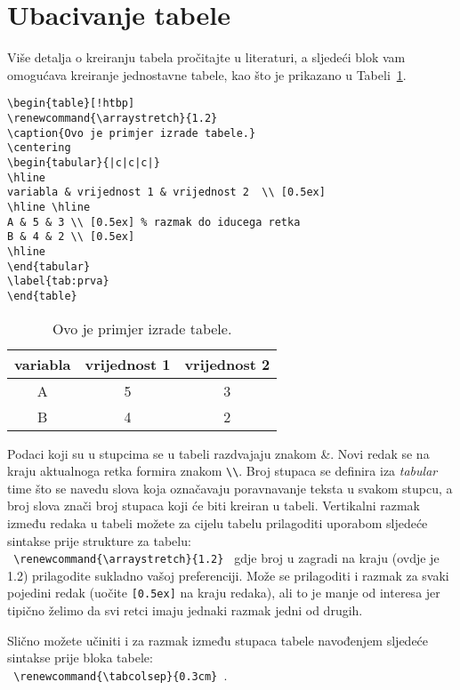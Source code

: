 \section{Ubacivanje tabele} 
Više detalja o kreiranju tabela pročitajte u literaturi, a sljedeći blok vam omogućava kreiranje jednostavne tabele, kao što je prikazano u Tabeli~\ref{tab:prva}.
\begin{verbatim}
\begin{table}[!htbp]
\renewcommand{\arraystretch}{1.2}
\caption{Ovo je primjer izrade tabele.}
\centering
\begin{tabular}{|c|c|c|}
\hline
variabla & vrijednost 1 & vrijednost 2  \\ [0.5ex]
\hline \hline  
A & 5 & 3 \\ [0.5ex] % razmak do iducega retka
B & 4 & 2 \\ [0.5ex]
\hline
\end{tabular}
\label{tab:prva}
\end{table}
\end{verbatim}

\begin{table}[!htbp]
\renewcommand{\arraystretch}{1.2}
\caption{Ovo je primjer izrade tabele.}
\centering
\begin{tabular}{|c|c|c|}
\hline
variabla & vrijednost 1 & vrijednost 2  \\ [0.5ex]
\hline \hline 
A & 5 & 3 \\ [0.5ex] %
B & 4 & 2 \\ [0.5ex]
\hline
\end{tabular}
\label{tab:prva}
\end{table}
%
Podaci koji su u stupcima se u tabeli razdvajaju znakom \&. Novi redak se na kraju aktualnoga retka formira znakom \verb|\\|. Broj stupaca se definira iza \emph{tabular} time što se navedu slova koja označavaju poravnavanje teksta u svakom stupcu, a broj slova znači broj stupaca koji će biti kreiran u tabeli. Vertikalni razmak između redaka u tabeli možete za cijelu tabelu prilagoditi uporabom sljedeće sintakse prije strukture za tabelu:\\
\verb| \renewcommand{\arraystretch}{1.2} | gdje broj u zagradi na kraju (ovdje je 1.2) prilagodite sukladno vašoj preferenciji. Može se prilagoditi i razmak za svaki pojedini redak (uočite \verb|[0.5ex]| na kraju redaka), ali to je manje od interesa jer tipično želimo da svi retci imaju jednaki razmak jedni od drugih.

Slično možete učiniti i za razmak između stupaca tabele navođenjem sljedeće sintakse prije bloka tabele:\\
\verb| \renewcommand{\tabcolsep}{0.3cm} |.



